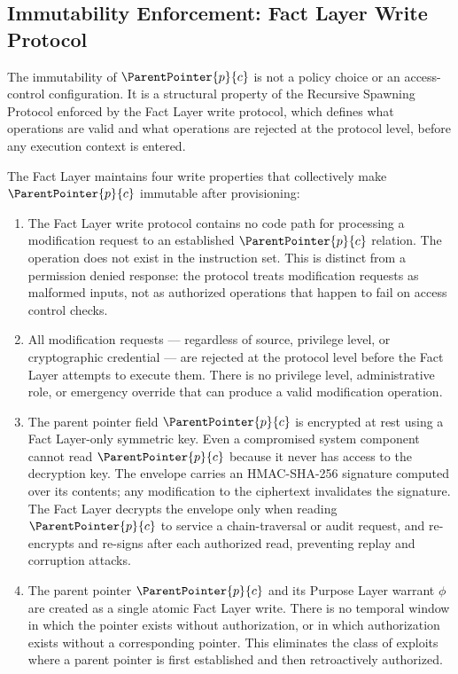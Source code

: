\subsection{Immutability Enforcement: Fact Layer Write Protocol}
\label{sec:fact-layer-write-protocol}

The immutability of $\ParentPointer{p}{c}$ is not a policy choice or an access-control configuration. It is a structural property of the Recursive Spawning Protocol enforced by the Fact Layer write protocol, which defines what operations are valid and what operations are rejected at the protocol level, before any execution context is entered.

The Fact Layer maintains four write properties that collectively make $\ParentPointer{p}{c}$ immutable after provisioning:

\begin{enumerate}
    \item[(W1) \textbf{No modification operation defined.}] The Fact Layer write protocol contains no code path for processing a modification request to an established $\ParentPointer{p}{c}$ relation. The operation does not exist in the instruction set. This is distinct from a permission denied response: the protocol treats modification requests as malformed inputs, not as authorized operations that happen to fail on access control checks.

    \item[(W2) \textbf{Protocol-level rejection of modification.}] All modification requests --- regardless of source, privilege level, or cryptographic credential --- are rejected at the protocol level before the Fact Layer attempts to execute them. There is no privilege level, administrative role, or emergency override that can produce a valid modification operation.

    \item[(W3) \textbf{Sealed memory envelope.}] The parent pointer field $\ParentPointer{p}{c}$ is encrypted at rest using a Fact Layer-only symmetric key. Even a compromised system component cannot read $\ParentPointer{p}{c}$ because it never has access to the decryption key. The envelope carries an HMAC-SHA-256 signature computed over its contents; any modification to the ciphertext invalidates the signature. The Fact Layer decrypts the envelope only when reading $\ParentPointer{p}{c}$ to service a chain-traversal or audit request, and re-encrypts and re-signs after each authorized read, preventing replay and corruption attacks.

    \item[(W4) \textbf{Atomic provisioning.}] The parent pointer $\ParentPointer{p}{c}$ and its Purpose Layer warrant $\phi$ are created as a single atomic Fact Layer write. There is no temporal window in which the pointer exists without authorization, or in which authorization exists without a corresponding pointer. This eliminates the class of exploits where a parent pointer is first established and then retroactively authorized.
\end{enumerate}

